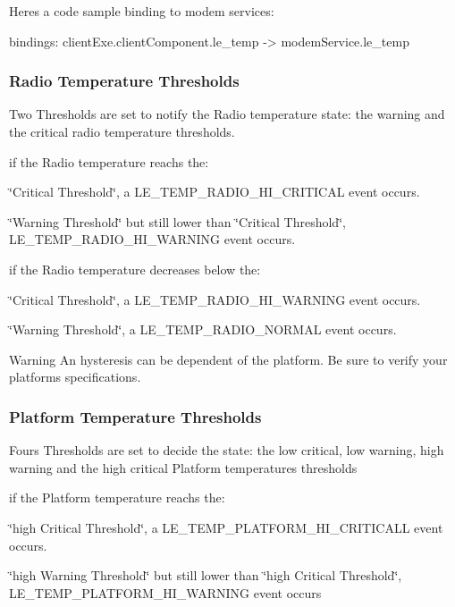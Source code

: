 Here\textquotesingle{}s a code sample binding to modem services\+: \begin{DoxyVerb}bindings:
{
   clientExe.clientComponent.le_temp -> modemService.le_temp
}
\end{DoxyVerb}
\hypertarget{c_temp_c_temp_radio}{}\subsubsection{Radio Temperature Thresholds}\label{c_temp_c_temp_radio}
Two Thresholds are set to notify the Radio temperature state\+: the warning and the critical radio temperature thresholds.

if the Radio temperature reachs the\+:
\begin{DoxyItemize}
\item \char`\"{}\+Critical Threshold\char`\"{}, a L\+E\+\_\+\+T\+E\+M\+P\+\_\+\+R\+A\+D\+I\+O\+\_\+\+H\+I\+\_\+\+C\+R\+I\+T\+I\+C\+A\+L event occurs.
\item \char`\"{}\+Warning Threshold\char`\"{} but still lower than \char`\"{}\+Critical Threshold\char`\"{}, L\+E\+\_\+\+T\+E\+M\+P\+\_\+\+R\+A\+D\+I\+O\+\_\+\+H\+I\+\_\+\+W\+A\+R\+N\+I\+N\+G event occurs.
\end{DoxyItemize}

if the Radio temperature decreases below the\+:
\begin{DoxyItemize}
\item \char`\"{}\+Critical Threshold\char`\"{}, a L\+E\+\_\+\+T\+E\+M\+P\+\_\+\+R\+A\+D\+I\+O\+\_\+\+H\+I\+\_\+\+W\+A\+R\+N\+I\+N\+G event occurs.
\item \char`\"{}\+Warning Threshold\char`\"{}, a L\+E\+\_\+\+T\+E\+M\+P\+\_\+\+R\+A\+D\+I\+O\+\_\+\+N\+O\+R\+M\+A\+L event occurs.
\end{DoxyItemize}

\begin{DoxyWarning}{Warning}
An hysteresis can be dependent of the platform. Be sure to verify your platform\textquotesingle{}s specifications.
\end{DoxyWarning}
\hypertarget{c_temp_c_temp_platform}{}\subsubsection{Platform Temperature Thresholds}\label{c_temp_c_temp_platform}
Fours Thresholds are set to decide the state\+: the low critical, low warning, high warning and the high critical Platform temperatures thresholds

if the Platform temperature reachs the\+:
\begin{DoxyItemize}
\item \char`\"{}high Critical Threshold\char`\"{}, a L\+E\+\_\+\+T\+E\+M\+P\+\_\+\+P\+L\+A\+T\+F\+O\+R\+M\+\_\+\+H\+I\+\_\+\+C\+R\+I\+T\+I\+C\+A\+L\+L event occurs.
\item \char`\"{}high Warning Threshold\char`\"{} but still lower than \char`\"{}high Critical Threshold\char`\"{}, L\+E\+\_\+\+T\+E\+M\+P\+\_\+\+P\+L\+A\+T\+F\+O\+R\+M\+\_\+\+H\+I\+\_\+\+W\+A\+R\+N\+I\+N\+G event occurs
\end{DoxyItemize}

